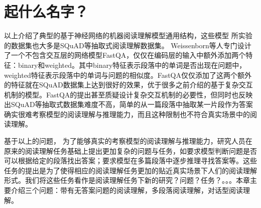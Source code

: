 \section{起什么名字？}
以上介绍了典型的基于神经网络的机器阅读理解模型通用结构，这些模型
所实验的数据集也大多是SQuAD等抽取式阅读理解数据集。
Weissenborn等人专门设计了一个不包含交互层的网络模型FastQA，仅仅在编码层的输入中额外添加两个特征：binary和weighted。其中binary特征表示段落中的单词是否出现在问题中，weighted特征表示段落中的单词与问题的相似度。FastQA仅仅添加了这两个额外的特征就在SQuAD数据集上达到很好的效果，优于很多之前介绍的基于复杂交互机制的模型。FastQA的提出甚至质疑设计复杂交互机制的必要性，但同时也反映出SQuAD等抽取式数据集难度不高，简单的从一篇段落中抽取某一片段作为答案确实很难考察模型的阅读理解与推理能力，而且这种限制也不符合真实场景中的阅读理解。

基于以上的问题，
为了能够真实的考察模型的阅读理解与推理能力，研究人员在原来的阅读理解任务基础上提出更加复杂的问题与任务，如要求模型判断问题是否可以根据给定的段落找出答案；要求模型在多篇段落中逐步推理寻找答案等。这些任务的提出是为了使得相应的阅读理解任务更加的贴近真实场景下人们的阅读理解形式。我们将这些任务看作是阅读理解任务下新的研究？问题？任务？。。。本章主要介绍三个问题：带有无答案问题的阅读理解，多段落阅读理解，对话型阅读理解。


